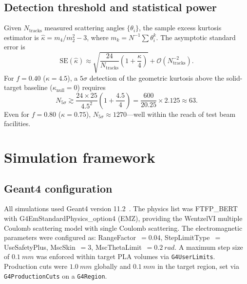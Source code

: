 \documentclass[final,5p,times,twocolumn]{elsarticle}
\begin{document}
\subsection{Detection threshold and statistical power}
\label{sec:detection}

Given $N_{\mathrm{tracks}}$ measured scattering angles $\{\theta_i\}$, the sample excess kurtosis estimator is $\hat{\kappa} = m_4/m_2^2 - 3$, where $m_k = N^{-1}\sum\theta_i^k$.  The asymptotic standard error is
\begin{equation}
  \mathrm{SE}(\hat{\kappa}) \approx \sqrt{\frac{24}{N_{\mathrm{tracks}}}\left(1+\frac{\kappa}{4}\right)} + \mathcal{O}(N_{\mathrm{tracks}}^{-2}).
  \label{eq:SE}
\end{equation}
For $f=0.40$ ($\kappa=4.5$), a $5\sigma$ detection of the geometric kurtosis above the solid-target baseline ($\kappa_{\mathrm{null}}=0$) requires
\begin{equation}
  N_{5\sigma} \gtrsim \frac{24\times 25}{4.5^2}\left(1+\frac{4.5}{4}\right) = \frac{600}{20.25}\times 2.125 \approx 63.
  \label{eq:N5sigma}
\end{equation}
Even for $f=0.80$ ($\kappa=0.75$), $N_{5\sigma}\approx 1270$---well within the reach of test beam facilities.

\section{Simulation framework}
\label{sec:simulation}

\subsection{Geant4 configuration}
\label{sec:geant4}

All simulations used Geant4 version 11.2~\cite{Agostinelli2003,Allison2016}.  The physics list was FTFP\_BERT with G4EmStandardPhysics\_option4 (EMZ), providing the WentzelVI multiple Coulomb scattering model with single Coulomb scattering.  The electromagnetic parameters were configured as: RangeFactor~$= 0.04$, StepLimitType~$=$ UseSafetyPlus, MscSkin~$= 3$, MscThetaLimit~$= \SI{0.2}{rad}$.  A maximum step size of $\SI{0.1}{mm}$ was enforced within target PLA volumes via \texttt{G4UserLimits}.  Production cuts were $\SI{1.0}{mm}$ globally and $\SI{0.1}{mm}$ in the target region, set via \texttt{G4ProductionCuts} on a \texttt{G4Region}.
\end{document}
